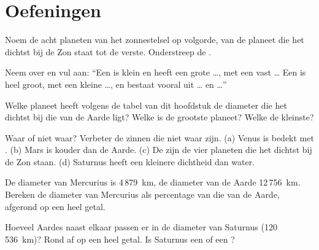 \section{Oefeningen}

\begin{exercise}[$\star$]\label{exo:g6:earth-a-planet:1}
Noem de acht planeten van het zonnestelsel op volgorde, van de planeet die
het dichtst bij de Zon staat tot de verste. Onderstreep de .
\end{exercise}

\begin{exercise}[$\star$]\label{exo:g6:earth-a-planet:2}
Neem over en vul aan: ``Een  is klein en heeft een grote
\ldots, met een vast \ldots{} Een  is heel groot, met een
kleine \ldots, en bestaat vooral uit \ldots{} en \ldots{}''
\end{exercise}

\begin{exercise}[$\star$]\label{exo:g6:earth-a-planet:3}
Welke planeet heeft volgens de tabel van dit hoofdstuk de diameter die het
dichtst bij die van de Aarde ligt? Welke is de grootste planeet? Welke de
kleinste?
\end{exercise}

\begin{exercise}[$\star$]\label{exo:g6:earth-a-planet:4}
Waar of niet waar? Verbeter de zinnen die niet waar zijn.
(a) Venus is bedekt met .
(b) Mars is kouder dan de Aarde.
(c) De  zijn de vier planeten die het dichtst bij de Zon staan.
(d) Saturnus heeft een kleinere dichtheid dan water.
\end{exercise}

\begin{exercise}[$\star\star$]\label{exo:g6:earth-a-planet:5}
De diameter van Mercurius is 4\,879~km, de diameter van de Aarde
12\,756~km. Bereken de diameter van Mercurius als percentage van die van de
Aarde, afgerond op een heel getal.
\end{exercise}

\begin{exercise}[$\star\star$]\label{exo:g6:earth-a-planet:6}
Hoeveel Aardes naast elkaar passen er in de diameter van Saturnus
(120\,536~km)? Rond af op een heel getal. Is Saturnus een  of
een ?
\end{exercise}

